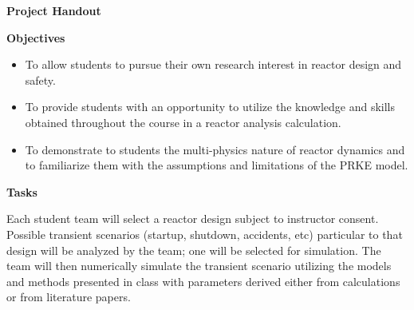 
\renewcommand{\DocTitle}{Project Handout}
\noprintanswers


\begin{center}
\textbf{\DocTitle}
\end{center}
\textbf{Objectives}
\begin{itemize}
\item{
To allow students to pursue their own research interest in reactor design and safety. 
}
\item{
To provide students with an opportunity to utilize the knowledge and skills obtained throughout the course in a reactor analysis calculation.
}
\item{To demonstrate to students the multi-physics nature of reactor dynamics and to familiarize them with the assumptions and limitations of the PRKE model.
}
\end{itemize}

\textbf{Tasks}

Each student team will select a reactor design subject to instructor consent.
Possible transient scenarios (startup, shutdown, accidents, etc) particular to that design will be analyzed by the team; one will be selected for simulation.
The team will then numerically simulate the transient scenario utilizing the models and methods presented in class with parameters derived either from calculations or from literature papers.

